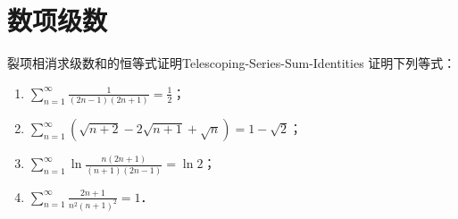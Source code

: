 \section{数项级数}

\begin{problem}{裂项相消求级数和的恒等式证明}{Telescoping-Series-Sum-Identities}
    证明下列等式：
    \begin{enumerate}
        \item $\sum_{n=1}^\infty \frac{1}{(2n-1)(2n+1)} = \frac{1}{2}$；
        \item $\sum_{n=1}^\infty (\sqrt{n+2} - 2\sqrt{n+1} + \sqrt{n}) = 1 - \sqrt{2}$；
        \item $\sum_{n=1}^\infty \ln \frac{n(2n+1)}{(n+1)(2n-1)} = \ln 2$；
        \item $\sum_{n=1}^\infty \frac{2n+1}{n^2(n+1)^2} = 1$．
    \end{enumerate}
\end{problem}

